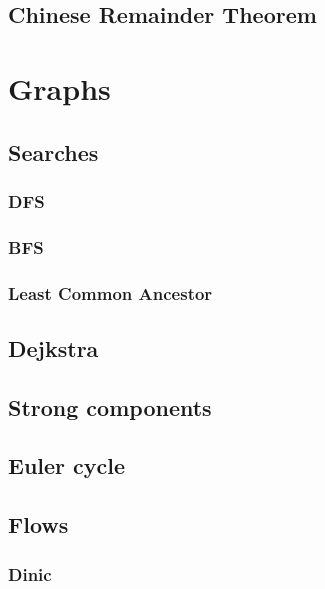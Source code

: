 \documentclass[a4paper,twocolumn]{extarticle}
\begin{document}
{        \subsection{Chinese Remainder Theorem}
        
        
        \section{Graphs}
        \subsection{Searches}
        \subsubsection{DFS}
        
        \subsubsection{BFS}
        
        \subsubsection{Least Common Ancestor}
        
        \subsection{Dejkstra}
        
        \subsection{Strong components}
        
        \subsection{Euler cycle}
        
        \subsection{Flows}
        \subsubsection{Dinic}
        
}
\end{document}
